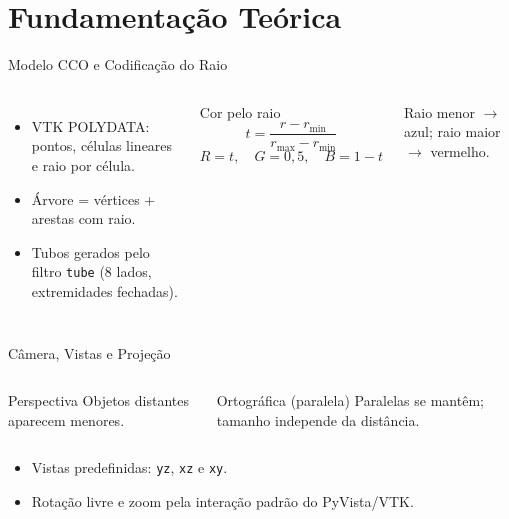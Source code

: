 \documentclass[aspectratio=169,11pt]{beamer}
\begin{document}
\section{Fundamentação Teórica}
\begin{frame}{Modelo CCO e Codificação do Raio}
\begin{columns}[T,onlytextwidth]
\begin{itemize}
  \item VTK POLYDATA: pontos, células lineares e raio por célula.
  \item Árvore = vértices + arestas com raio.
  \item Tubos gerados pelo filtro \texttt{tube} (8 lados, extremidades fechadas).
\end{itemize}
\begin{block}{Cor pelo raio}
\[ t=\frac{r-r_{\min}}{r_{\max}-r_{\min}} \]
\[ R=t,\quad G=0{,}5,\quad B=1-t \]
\end{block}
Raio menor $\rightarrow$ azul; raio maior $\rightarrow$ vermelho.
\end{columns}
\end{frame}

\begin{frame}{Câmera, Vistas e Projeção}
\begin{columns}[T,onlytextwidth]
\begin{block}{Perspectiva}
Objetos distantes aparecem menores.
\end{block}
\begin{block}{Ortográfica (paralela)}
Paralelas se mantêm; tamanho independe da distância.
\end{block}
\end{columns}
\vspace{0.2cm}
\begin{itemize}
  \item Vistas predefinidas: \texttt{yz}, \texttt{xz} e \texttt{xy}.
  \item Rotação livre e zoom pela interação padrão do PyVista/VTK.
\end{itemize}
\end{frame}
\end{document}
